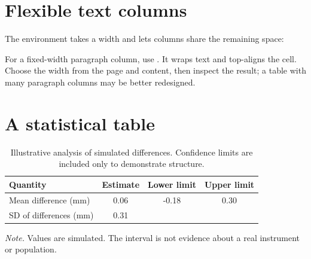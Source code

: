 \section{Flexible text columns}

The  environment takes a width and lets  columns share
the remaining space:


For a fixed-width paragraph column, use . It wraps text and
top-aligns the cell. Choose the width from the page and content, then inspect
the result; a table with many paragraph columns may be better redesigned.

\section{A statistical table}

\begin{table}[htbp]
  \centering
  \caption{Illustrative analysis of simulated differences. Confidence limits
  are included only to demonstrate structure.}
  \label{tab:statistical-summary}
  \begin{tabular}{@{}lS[table-format=1.2]S[table-format=-1.2]S[table-format=1.2]@{}}
    \toprule
    {Quantity} & {Estimate} & {Lower limit} & {Upper limit} \\
    \midrule
    Mean difference (mm) & 0.06 & -0.18 & 0.30 \\
    SD of differences (mm) & 0.31 & {} & {} \\
    \bottomrule
  \end{tabular}

  \begin{minipage}{0.86\textwidth}
    \smallskip\footnotesize
    \textit{Note.} Values are simulated. The interval is not evidence about a
    real instrument or population.
  \end{minipage}
\end{table}

